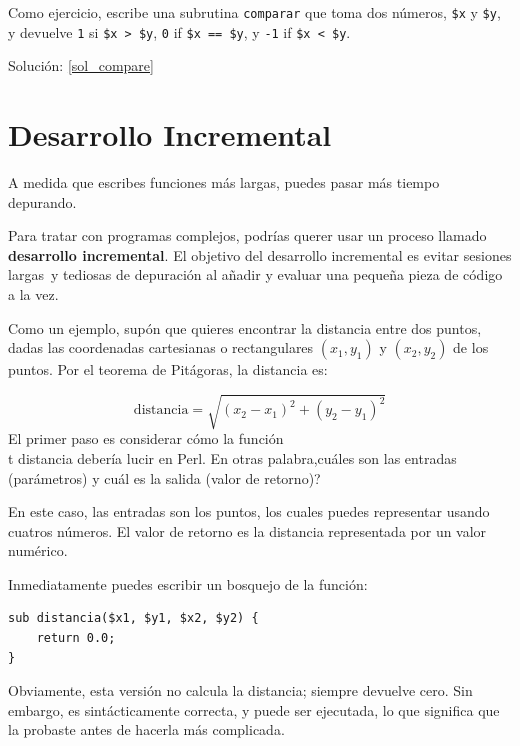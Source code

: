 \label{compare}
Como ejercicio, escribe una subrutina {\tt comparar}
que toma dos números, {\tt \$x} y {\tt \$y}, y devuelve
{\tt 1} si {\tt \$x > \$y}, {\tt 0} if {\tt \$x == \$y}, y 
{\tt -1} if {\tt \$x < \$y}.

Solución: \ref{sol_compare}


\section{Desarrollo Incremental}
\label{incremental.development}

A medida que escribes funciones más largas, puedes 
pasar más tiempo depurando.

Para tratar con programas complejos, podrías querer 
usar un proceso llamado {\bf desarrollo incremental}. El 
objetivo del desarrollo incremental es evitar sesiones largas\
y tediosas de depuración al añadir y evaluar una pequeña pieza
de código a la vez.

Como un ejemplo, supón que quieres encontrar la distancia 
entre dos puntos, dadas las coordenadas cartesianas o rectangulares
$(x_1, y_1)$ y $(x_2, y_2)$ de los puntos. Por el teorema de Pitágoras,
la distancia es:


\begin{displaymath}
\mathrm{distancia} = \sqrt{(x_2 - x_1)^2 + (y_2 - y_1)^2}
\end{displaymath}
%
El primer paso es considerar cómo la función {\\t distancia} 
debería lucir en Perl. En otras palabra,cuáles son las entradas (parámetros)
y cuál es la salida (valor de retorno)?

En este caso, las entradas son los puntos, los cuales puedes 
representar usando cuatros números. El valor de retorno es la distancia
representada por un valor numérico.

Inmediatamente puedes escribir un bosquejo de la función:

\begin{verbatim}
sub distancia($x1, $y1, $x2, $y2) {
    return 0.0;
}
\end{verbatim}
%
Obviamente, esta versión no calcula la distancia; siempre 
devuelve cero. Sin embargo, es sintácticamente correcta, y 
puede ser ejecutada, lo que significa que la probaste antes 
de hacerla más complicada.

